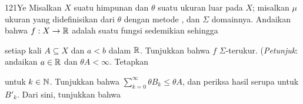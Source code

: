 {\spheader 121Ye Misalkan $X$ suatu himpunan dan $\theta$ suatu ukuran
luar pada $X$; misalkan $\mu$ ukuran yang didefinisikan dari $\theta$
dengan metode \Caratheodory, dan $\Sigma$ domainnya. Andaikan bahwa
$f:X\to\Bbb R$ adalah suatu fungsi sedemikian sehingga


\noindent setiap kali $A\subseteq X$ dan $a<b$ dalam $\Bbb R$.
Tunjukkan bahwa $f$ $\Sigma$-terukur. ({\it Petunjuk\/}: andaikan
$a\in\Bbb R$ dan $\theta A<\infty$. Tetapkan



\noindent untuk $k\in\Bbb N$. Tunjukkan bahwa
$\sum_{k=0}^{\infty}\theta B_k\le\theta A$, dan periksa hasil serupa
untuk $B'_k$. Dari sini, tunjukkan bahwa

}%

